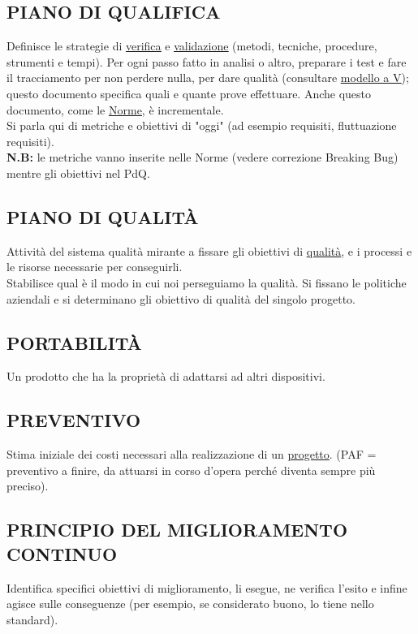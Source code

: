 		\subsection{PIANO DI QUALIFICA}		\label{pianoqualifica}
		Definisce le strategie di \underline{\hyperref[verificare]{verifica}} e \underline{\hyperref[validare]{validazione}} (metodi, tecniche, procedure, strumenti e tempi). Per ogni passo fatto in analisi o altro, preparare i test e fare il tracciamento per non perdere nulla, per dare qualità (consultare \underline{\hyperref[V]{modello a V}}); questo documento specifica quali e quante prove effettuare. Anche questo documento, come le \underline{\hyperref[norme]{Norme}}, è incrementale. \\
		Si parla qui di metriche e obiettivi di "oggi" (ad esempio requisiti, fluttuazione requisiti). \\
		\textbf{N.B:} le metriche vanno inserite nelle Norme (vedere correzione Breaking Bug) mentre gli obiettivi nel PdQ.
		
		\subsection{PIANO DI QUALITÀ}		\label{pianoqualita} %
		Attività del sistema qualità mirante a fissare gli obiettivi di \underline{\hyperref[qualita]{qualità}}, e i processi e le risorse necessarie per conseguirli. \\
		Stabilisce qual è il modo in cui noi perseguiamo la qualità. Si fissano le politiche aziendali e si determinano gli obiettivo di qualità del singolo progetto.
		
		\subsection{PORTABILITÀ}		\label{portabilita}
		Un prodotto che ha la proprietà di adattarsi ad altri dispositivi.
		  		 
		\subsection{PREVENTIVO}  \label{preventivo}
		Stima iniziale dei costi necessari alla realizzazione di un \underline{\hyperref[progetto]{progetto}}. (PAF = preventivo a finire, da attuarsi in corso d'opera perché diventa sempre più preciso).
	
		\subsection{PRINCIPIO DEL MIGLIORAMENTO CONTINUO}  \label{miglioramentocontinuo}
		Identifica specifici obiettivi di miglioramento, li esegue, ne verifica l'esito e infine agisce sulle conseguenze (per esempio, se considerato buono, lo tiene nello standard).
		
